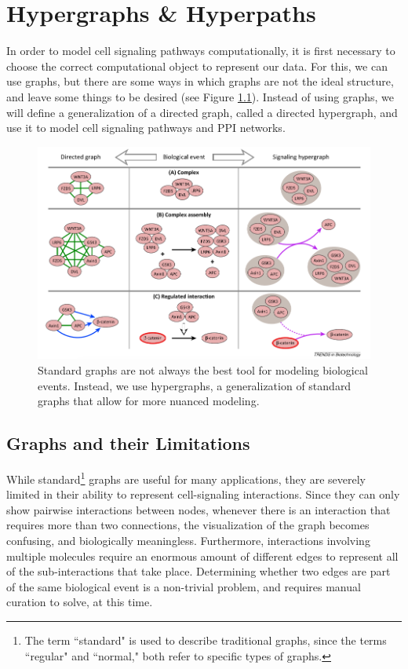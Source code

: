 \documentclass[12pt,twoside]{reedthesis}
\theoremstyle{definition}
\begin{document}
\chapter{Hypergraphs \& Hyperpaths}

In order to model cell signaling pathways computationally, it is first necessary to choose the correct computational object to represent our data. For this, we can use graphs, but there are some ways in which graphs are not the ideal structure, and leave some things to be desired (see Figure \ref{fig:anna_fig}). Instead of using graphs, we will define a generalization of a directed graph, called a directed hypergraph, and use it to model cell signaling pathways and PPI networks.

\begin{figure}[h]
  \begin{center}
    \includegraphics[width=\textwidth]{anna_fig}
  \caption[The issue with standard graphs.]{Standard graphs are not always the best tool for modeling biological events. Instead, we use hypergraphs, a generalization of standard graphs that allow for more nuanced modeling.}
  \label{fig:anna_fig}
  \end{center}
\end{figure}

\section{Graphs and their Limitations}

While standard\footnote{The term ``standard" is used to describe traditional graphs, since the terms ``regular" and ``normal," both refer to specific types of graphs.} graphs are useful for many applications, they are severely limited in their ability to represent cell-signaling interactions.  Since they can only show pairwise interactions between nodes, whenever there is an interaction that requires more than two connections, the visualization of the graph becomes confusing, and biologically meaningless.  Furthermore, interactions involving multiple molecules require an enormous amount of different edges to represent all of the sub-interactions that take place.  Determining whether two edges are part of the same biological event is a non-trivial problem, and requires manual curation to solve, at this time.\par
\end{document}
